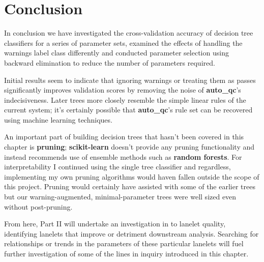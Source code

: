 \section{Conclusion}

In conclusion we have investigated the cross-validation accuracy of decision
tree classifiers for a series of parameter sets, examined the effects of
handling the warnings label class differently and conducted parameter selection
using backward elimination to reduce the number of parameters required.

Initial results seem to indicate that ignoring warnings or treating them as
passes significantly improves validation scores by removing the noise of
\textbf{auto\_qc}'s indecisiveness. Later trees more closely resemble
the simple linear rules of the current system; it's certainly possible that
\textbf{auto\_qc}'s rule set can be recovered using machine learning techniques.

An important part of building decision trees that hasn't been covered in this
chapter is \textbf{pruning}; \textbf{scikit-learn} doesn't provide any pruning
functionality and instead recommends use of ensemble methods such as
\textbf{random forests}. For interpretability I continued using the single tree
classifier and regardless, implementing my own pruning algorithms would haven
fallen outside the scope of this project. Pruning would certainly have assisted
with some of the earlier trees but our warning-augmented, minimal-parameter
trees were well sized even without post-pruning.

From here, Part II will undertake an investigation in to lanelet quality,
identifying lanelets that improve or detriment downstream analysis. Searching
for relationships or trends in the parameters of these particular lanelets will
fuel further investigation of some of the lines in inquiry introduced in this
chapter.

